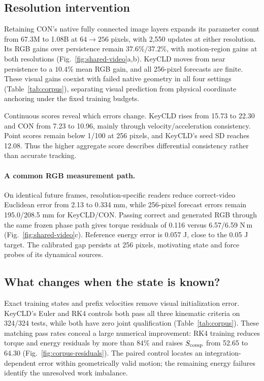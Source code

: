\documentclass[10pt,twocolumn,letterpaper]{article}
\begin{document}
\subsection{Resolution intervention}
Retaining CON's native fully connected image layers expands its parameter count from 67.3M to 1.08B at $64\!\to\!256$ pixels, with 2,550 updates at either resolution. Its RGB gains over persistence remain $37.6\%/37.2\%$, with motion-region gains at both resolutions (Fig.~\ref{fig:shared-video}a,b). KeyCLD moves from near persistence to a $10.4\%$ mean RGB gain, and all 256-pixel forecasts are finite. These visual gains coexist with failed native geometry in all four settings (Table~\ref{tab:corpus}), separating visual prediction from physical coordinate anchoring under the fixed training budgets.

Continuous scores reveal which errors change. KeyCLD rises from 15.73 to 22.30 and CON from 7.23 to 10.96, mainly through velocity/acceleration consistency. Point scores remain below 1/100 at 256 pixels, and KeyCLD's seed SD reaches 12.08. Thus the higher aggregate score describes differential consistency rather than accurate tracking.

\paragraph{A common RGB measurement path.}
On identical future frames, resolution-specific readers reduce correct-video Euclidean error from 2.13 to 0.334 mm, while 256-pixel forecast errors remain 195.0/208.5 mm for KeyCLD/CON. Passing correct and generated RGB through the same frozen phase path gives torque residuals of 0.116 versus 6.57/6.59 N\,m (Fig.~\ref{fig:shared-video}c). Reference energy error is 0.057 J, close to the 0.05 J target. The calibrated gap persists at 256 pixels, motivating state and force probes of its dynamical sources.

\subsection{What changes when the state is known?}
Exact training states and prefix velocities remove visual initialization error. KeyCLD's Euler and RK4 controls both pass all three kinematic criteria on 324/324 tests, while both have zero joint qualification (Table~\ref{tab:corpus}). These matching pass rates conceal a large numerical improvement: RK4 training reduces torque and energy residuals by more than $84\%$ and raises $S_{\rm comp}$ from 52.65 to 64.30 (Fig.~\ref{fig:corpus-residuals}). The paired control locates an integration-dependent error within geometrically valid motion; the remaining energy failures identify the unresolved work imbalance.
\end{document}
